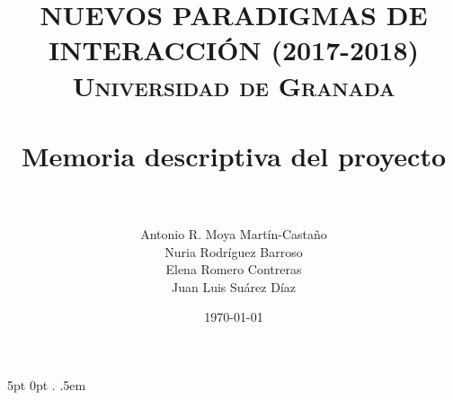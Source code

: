 
\usepackage{hyperref}
\usepackage{url}
\usepackage[usenames]{color}
\usepackage{subfigure}

\makeatletter
\def\BState{\State\hskip-\ALG@thistlm}
\makeatother


\title{	
\normalfont \normalsize 
\textsc{{\bf NUEVOS PARADIGMAS DE INTERACCIÓN (2017-2018)} \\ Universidad de Granada} \\ [25pt] %
\horrule{0.5pt} \\[0.4cm] %
\huge Memoria descriptiva del proyecto \\ %
\horrule{2pt} \\[0.5cm] %
}

\author{Antonio R. Moya Martín-Castaño\\
		Nuria Rodríguez Barroso\\ 
		Elena Romero Contreras \\
		Juan Luis Suárez Díaz
		} %

\date{\normalsize\today} %



\usepackage{amsmath, amsthm, amssymb, amsfonts, amscd} %

{5pt}                %
{0pt}                %
{}                   %
{}                   %
{\bf}                %
{.}                  %
{.5em}               %
{}                   %

